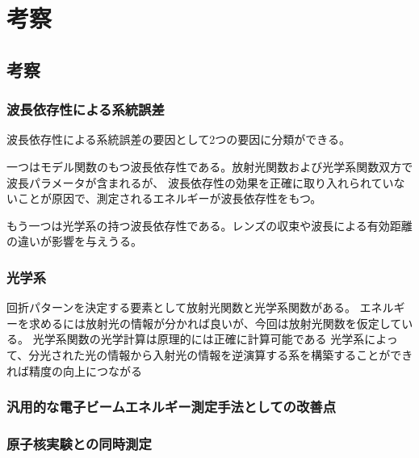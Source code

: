 \documentclass[a4paper,11pt,uplatex]{jsbook}
\begin{document}
\chapter{考察}
\section{考察}
\subsection{波長依存性による系統誤差}
波長依存性による系統誤差の要因として2つの要因に分類ができる。

一つはモデル関数のもつ波長依存性である。放射光関数および光学系関数双方で波長パラメータが含まれるが、
波長依存性の効果を正確に取り入れられていないことが原因で、測定されるエネルギーが波長依存性をもつ。

もう一つは光学系の持つ波長依存性である。レンズの収束や波長による有効距離の違いが影響を与えうる。

\subsection{光学系}
回折パターンを決定する要素として放射光関数と光学系関数がある。
エネルギーを求めるには放射光の情報が分かれば良いが、今回は放射光関数を仮定している。
光学系関数の光学計算は原理的には正確に計算可能である
光学系によって、分光された光の情報から入射光の情報を逆演算する系を構築することができれば精度の向上につながる

\subsection{汎用的な電子ビームエネルギー測定手法としての改善点}

\subsection{原子核実験との同時測定}
\end{document}
